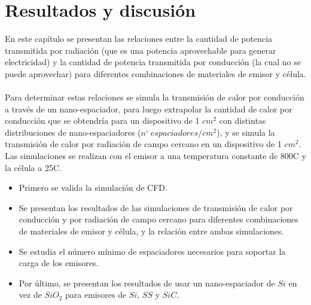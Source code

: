 \chapter{Resultados y discusión}
En este capítulo se presentan las relaciones entre la cantidad de potencia transmitida por radiación (que es una potencia aprovechable para generar electricidad) y la cantidad de potencia transmitida por conducción (la cual no se puede aprovechar) para diferentes combinaciones de materiales de emisor y célula.\\\\
Para determinar estas relaciones se simula la transmisión de calor por conducción a través de un nano-espaciador, para luego extrapolar la cantidad de calor por conducción que se obtendría para un dispositivo de 1 $cm^2$ con distintas distribuciones de nano-espaciadores ($n^{\underline{\circ}}\ espaciadores/cm^2$), y se simula la transmisión de calor por radiación de campo cercano en un dispositivo de 1 $cm^2$. Las simulaciones se realizan con el emisor a una temperatura constante de 800\textdegree C y la célula a 25\textdegree C.
\begin{itemize}
	\item Primero se valida la simulación de CFD.
	\item Se presentan los resultados de las simulaciones de transmisión de calor por conducción y por radiación de campo cercano para diferentes combinaciones de materiales de emisor y célula, y la relación entre ambas simulaciones.
	\item Se estudia el número mínimo de espaciadores necesarios para soportar la carga de los emisores.
	\item Por último, se presentan los resultados de usar un nano-espaciador de $Si$ en vez de $SiO_2$ para emisores de $Si$, $SS$ y $SiC$.
\end{itemize}
